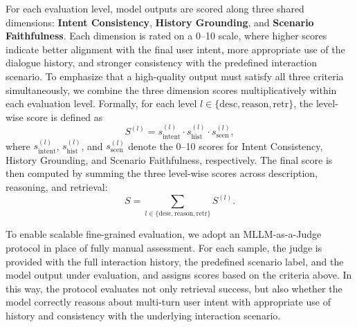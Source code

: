 For each evaluation level, model outputs are scored along three shared dimensions: \textbf{Intent Consistency}, \textbf{History Grounding}, and \textbf{Scenario Faithfulness}. Each dimension is rated on a 0--10 scale, where higher scores indicate better alignment with the final user intent, more appropriate use of the dialogue history, and stronger consistency with the predefined interaction scenario. To emphasize that a high-quality output must satisfy all three criteria simultaneously, we combine the three dimension scores multiplicatively within each evaluation level. Formally, for each level $l \in \{\mathrm{desc}, \mathrm{reason}, \mathrm{retr}\}$, the level-wise score is defined as
\[
S^{(l)} = s_{\mathrm{intent}}^{(l)} \cdot s_{\mathrm{hist}}^{(l)} \cdot s_{\mathrm{scen}}^{(l)},
\]
where $s_{\mathrm{intent}}^{(l)}$, $s_{\mathrm{hist}}^{(l)}$, and $s_{\mathrm{scen}}^{(l)}$ denote the 0--10 scores for Intent Consistency, History Grounding, and Scenario Faithfulness, respectively. The final score is then computed by summing the three level-wise scores across description, reasoning, and retrieval:
\[
S = \sum_{l \in \{\mathrm{desc}, \mathrm{reason}, \mathrm{retr}\}} S^{(l)}.
\]

To enable scalable fine-grained evaluation, we adopt an MLLM-as-a-Judge protocol in place of fully manual assessment. For each sample, the judge is provided with the full interaction history, the predefined scenario label, and the model output under evaluation, and assigns scores based on the criteria above. In this way, the protocol evaluates not only retrieval success, but also whether the model correctly reasons about multi-turn user intent with appropriate use of history and consistency with the underlying interaction scenario.